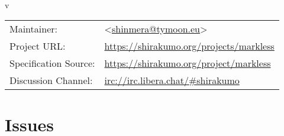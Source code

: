 \documentclass[12pt,a4paper,titlepage]{article}
\title{\doctitle}
\author{\docauthor}
\date{\d_mny\today}
\begin{document}
\begin{titlepage}
  \begin{center}
    \vspace*{5cm}
    {\bfseries\fontsize{32pt}{30pt}\selectfont\doctitle} \\
    \vspace{0.5cm}
    {\large v\gittag}
    \vfill
    \begin{tabular}{ll}
      Maintainer: & \docauthor{} <\href{mailto:shinmera@tymoon.eu}{shinmera@tymoon.eu}> \\
      Project URL: & \url{https://shirakumo.org/projects/markless} \\
      Specification Source: & \url{https://shirakumo.org/project/markless} \\
      Discussion Channel: & \url{irc://irc.libera.chat/#shirakumo} \\
    \end{tabular}
  \end{center}
\end{titlepage}
\tableofcontents








\newpage\section*{Issues}\label{section:ISSUES}

\glsaddall
\newpage\label{section:GLOSSARY}\printglossaries
\end{document}
